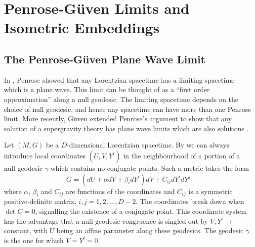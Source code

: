 \documentclass[11pt, a4paper, titlepage]{article}
\begin{document}
\section{Penrose-G\"{u}ven Limits and Isometric Embeddings}
\subsection{The Penrose-G\"{u}ven Plane Wave Limit}
In \cite{pl}, Penrose showed that any Lorentzian spacetime has a limiting
spacetime which is a plane wave. This limit can be thought of as a ``first order
approximation'' along a null geodesic. The limiting spacetime depends on the
choice of null geodesic, and hence any spacetime can have more than one Penrose
limit. More recently, G\"{u}ven extended Penrose's argument to show that any
solution of a supergravity theory has plane wave limits which are also
solutions \cite{guven}.

Let $(M,G)$ be a $D$-dimensional Lorentzian spacetime. By \cite{penrose} we can
always introduce local coordinates $(U,V,Y^i)$ in the neighbourhood of a portion
of a null geodesic $\gamma$ which contains no conjugate points. Such a metric
takes the form
\begin{equation}
  \label{eq:bpg:initial:G}
  G = \left(dU + \alpha dV + \beta_i dY^i \right)dV + C_{ij} dY^i dY^j
\end{equation}
where $\alpha$, $\beta_i$ and $C_{ij}$ are functions of the coordinates and
$C_{ij}$ is a symmetric positive-definite matrix, $i,j=1,2,\ldots,D-2$. The
coordinates break down when $\det{C}=0$, signalling the existence of a conjugate
point. This coordinate system has the advantage that a null geodesic congruence
is singled out by $V,Y^i\rightarrow$ constant, with $U$ being an affine
parameter along these geodesics. The geodesic $\gamma$ is the one for which
$V=Y^i=0$.
\end{document}

